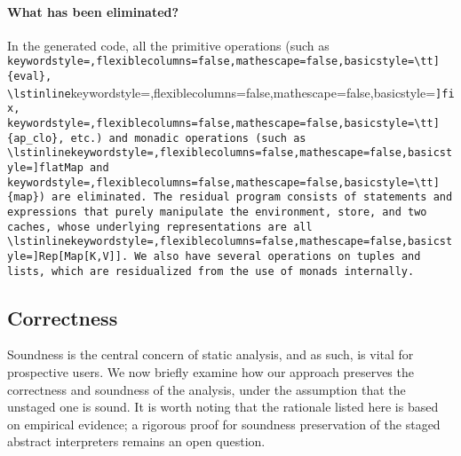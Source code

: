 \paragraph{What has been eliminated?} In the generated code, all the
primitive operations (such as \lstinline[keywordstyle=,flexiblecolumns=false,mathescape=false,basicstyle=\tt]{eval}, \lstinline[keywordstyle=,flexiblecolumns=false,mathescape=false,basicstyle=\tt]{fix}, \lstinline[keywordstyle=,flexiblecolumns=false,mathescape=false,basicstyle=\tt]{ap_clo}, etc.) and monadic
operations (such as \lstinline[keywordstyle=,flexiblecolumns=false,mathescape=false,basicstyle=\tt]{flatMap} and \lstinline[keywordstyle=,flexiblecolumns=false,mathescape=false,basicstyle=\tt]{map}) are eliminated. The residual program
consists of statements and expressions that purely manipulate the environment,
store, and two caches, whose underlying representations are all \lstinline[keywordstyle=,flexiblecolumns=false,mathescape=false,basicstyle=\tt]{Rep[Map[K,V]]}. We
also have several operations on tuples and lists, which are residualized from
the use of monads internally.


\subsection{Correctness}

Soundness is the central concern of static analysis, and as such, is vital
for prospective users. We now briefly examine how our
approach preserves the correctness and soundness of the analysis, under the
assumption that the unstaged one is sound. It is worth noting that the rationale
listed here is based on empirical evidence; a rigorous proof for soundness
preservation of the staged abstract interpreters remains an open question.

